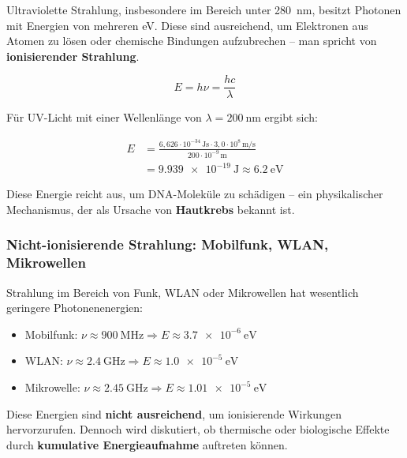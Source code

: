 Ultraviolette Strahlung, insbesondere im Bereich unter \SI{280}{\nano\meter}, besitzt Photonen mit Energien von mehreren \si{\electronvolt}. Diese sind ausreichend, um Elektronen aus Atomen zu lösen oder chemische Bindungen aufzubrechen – man spricht von \textbf{ionisierender Strahlung}.

\begin{equation*}
	E = h\nu = \frac{hc}{\lambda}
	\label{eq:photonenergie}
\end{equation*}

Für UV-Licht mit einer Wellenlänge von \(\lambda = \SI{200}{\nano\meter}\) ergibt sich:

\begin{align*}
	E &= \frac{6{,}626 \cdot 10^{-34}\,\si{\joule\second} \cdot 3{,}0 \cdot 10^8\,\si{\meter\per\second}}{200 \cdot 10^{-9}\,\si{\meter}} \\
	&= \SI{9.939e-19}{\joule} \approx \SI{6.2}{\electronvolt}
\end{align*}

Diese Energie reicht aus, um DNA-Moleküle zu schädigen – ein physikalischer Mechanismus, der als Ursache von \textbf{Hautkrebs} bekannt ist.

\subsubsection{Nicht-ionisierende Strahlung:  Mobilfunk, WLAN, Mikrowellen}

Strahlung im Bereich von Funk, WLAN oder Mikrowellen hat wesentlich geringere Photonenenergien:

\begin{itemize}
	\item Mobilfunk: $\nu \approx \SI{900}{\mega\hertz} \Rightarrow E \approx \SI{3.7e-6}{\electronvolt}$
	\item WLAN: $\nu \approx \SI{2.4}{\giga\hertz} \Rightarrow E \approx \SI{1.0e-5}{\electronvolt}$
	\item Mikrowelle: $\nu \approx \SI{2.45}{\giga\hertz} \Rightarrow E \approx \SI{1.01e-5}{\electronvolt}$
\end{itemize}

Diese Energien sind \textbf{nicht ausreichend}, um ionisierende Wirkungen hervorzurufen. Dennoch wird diskutiert, ob thermische oder biologische Effekte durch \textbf{kumulative Energieaufnahme} auftreten können.

